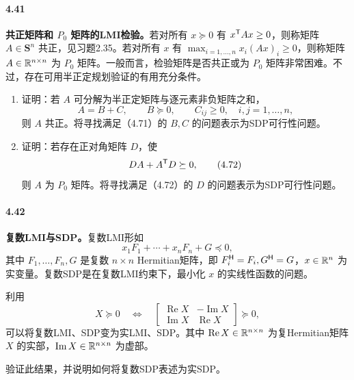 \paragraph{4.41}\textbf{共正矩阵和 $P_0$ 矩阵的LMI检验。}若对所有 $x\succeq0$ 有 $x^\mathsf T Ax\ge0$，则称矩阵 $A\in\mathbf S^n$ 共正，见习题2.35。若对所有 $x$ 有 $\max_{i=1,\ldots,n}x_i(Ax)_i\ge0$，则称矩阵 $A\in\mathbb R^{n\times n}$ 为 $P_0$ 矩阵。一般而言，检验矩阵是否共正或为 $P_0$ 矩阵非常困难。不过，存在可用半正定规划验证的有用充分条件。
\begin{enumerate}[label=(\alph*)]
\item 证明：若 $A$ 可分解为半正定矩阵与逐元素非负矩阵之和，
\begin{equation}
A=B+C,\qquad B\succeq0,\qquad C_{ij}\ge0,\quad i,j=1,\ldots,n,\tag{4.71}
\end{equation}
则 $A$ 共正。将寻找满足（4.71）的 $B,C$ 的问题表示为SDP可行性问题。
\item 证明：若存在正对角矩阵 $D$，使
\begin{equation}
DA+A^\mathsf T D\succeq0,\tag{4.72}
\end{equation}
则 $A$ 为 $P_0$ 矩阵。将寻找满足（4.72）的 $D$ 的问题表示为SDP可行性问题。
\end{enumerate}

\paragraph{4.42}\textbf{复数LMI与SDP。}复数LMI形如
\[
x_1F_1+\cdots+x_nF_n+G\preceq0,
\]
其中 $F_1,\ldots,F_n,G$ 是复数 $n\times n$ Hermitian矩阵，即 $F_i^\mathsf H=F_i,G^\mathsf H=G$，$x\in\mathbb R^n$ 为实变量。复数SDP是在复数LMI约束下，最小化 $x$ 的实线性函数的问题。

利用
\[
X\succeq0\quad\Longleftrightarrow\quad
\begin{bmatrix}\operatorname{Re}X&-\operatorname{Im}X\\\operatorname{Im}X&\operatorname{Re}X\end{bmatrix}\succeq0,
\]
可以将复数LMI、SDP变为实LMI、SDP。其中 $\operatorname{Re}X\in\mathbb R^{n\times n}$ 为复Hermitian矩阵 $X$ 的实部，$\operatorname{Im}X\in\mathbb R^{n\times n}$ 为虚部。

验证此结果，并说明如何将复数SDP表述为实SDP。

